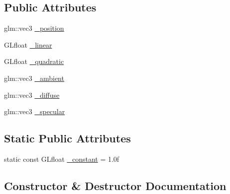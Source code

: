 \subsection*{Public Attributes}
\begin{DoxyCompactItemize}
\item 
glm\+::vec3 \hyperlink{structLarp_1_1PointLight_a5a5dfbb7a5f9225264de04c7f2057188}{\+\_\+position}
\item 
G\+Lfloat \hyperlink{structLarp_1_1PointLight_ad1c64e128dbc6edc2b5a2cb373a3e3dc}{\+\_\+linear}
\item 
G\+Lfloat \hyperlink{structLarp_1_1PointLight_af4385e38db129e0fc4b1af9c8bd6bfec}{\+\_\+quadratic}
\item 
glm\+::vec3 \hyperlink{structLarp_1_1PointLight_ad4f86b57c7ef0d914edb7dd1c234010f}{\+\_\+ambient}
\item 
glm\+::vec3 \hyperlink{structLarp_1_1PointLight_a84af06eeff58f67ffc14754b9ad60dbe}{\+\_\+diffuse}
\item 
glm\+::vec3 \hyperlink{structLarp_1_1PointLight_a9f649b8dba0654cec63d2ae78c981706}{\+\_\+specular}
\end{DoxyCompactItemize}
\subsection*{Static Public Attributes}
\begin{DoxyCompactItemize}
\item 
static const G\+Lfloat \hyperlink{structLarp_1_1PointLight_a6ee45a0090242c188ea24d239a7bc029}{\+\_\+constant} = 1.\+0f
\end{DoxyCompactItemize}


\subsection{Constructor \& Destructor Documentation}

